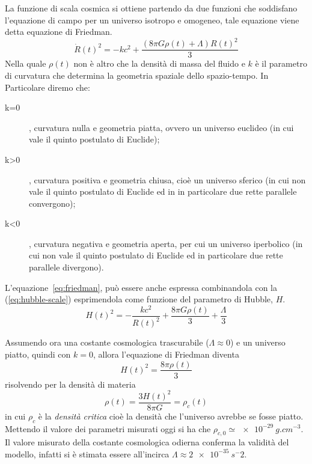 La funzione di scala cosmica si ottiene partendo da due funzioni che soddisfano l'equazione di campo per un universo isotropo e omogeneo, tale equazione viene detta equazione di Friedman.
\begin{equation}\label{eq:friedman}
    \dot{R}(t)^2 = -kc^2 + \frac{(8 \pi G \rho(t)+\Lambda) R(t)^2}{3}
\end{equation}
Nella quale $\rho(t)$ non è altro che la densità di massa del fluido e $k$ è il parametro di curvatura che determina la geometria spaziale dello spazio-tempo. In Particolare diremo che:
\begin{description}
    \item[k=0], curvatura nulla e geometria piatta, ovvero un universo euclideo (in cui vale il quinto postulato di Euclide);
    \item[k>0], curvatura positiva e geometria chiusa, cioè un universo sferico (in cui non vale il quinto postulato di Euclide ed in in particolare due rette parallele convergono);
    \item[k<0], curvatura negativa e geometria aperta, per cui un universo iperbolico  (in cui non vale il quinto postulato di Euclide ed in particolare due rette parallele divergono).
\end{description}

L'equazione~\ref{eq:friedman}, può essere anche espressa combinandola con la (\ref{eq:hubble-scale}) esprimendola come funzione del parametro di Hubble, $H$.
\begin{equation}\label{eq:friedman-hubble}
    H(t)^2 = - \frac{kc^2}{R(t)^2} + \frac{8\pi G \rho (t)}{3} + \frac{\Lambda}{3}
\end{equation}

Assumendo ora una costante cosmologica trascurabile ($\Lambda \approx 0$) e un universo piatto, quindi con $k = 0$, allora l'equazione di Friedman diventa
\[
    H(t)^2 = \frac{8 \pi \rho (t)}{3}
\]
risolvendo per la densità di materia
\[
    \rho (t) = \frac{3 H(t)^2}{8 \pi G} = \rho_c (t)
\]
in cui $\rho_c$ è la \textit{densità critica} cioè la densità che l'universo avrebbe se fosse piatto. Mettendo il valore dei parametri misurati oggi si ha che $\rho_{c,0} \simeq \SI{e-29}{g.cm^{-3}}$. Il valore misurato della costante cosmologica odierna conferma la validità del modello, infatti si è stimata essere all'incirca $\Lambda \approx \SI{2e-35}{s^-2}$.

